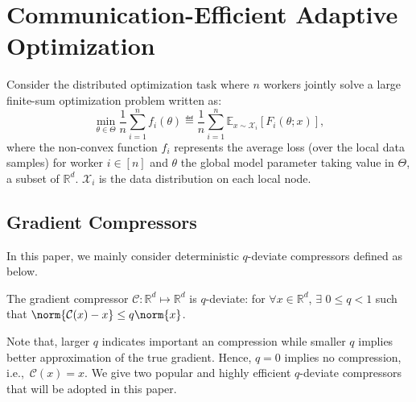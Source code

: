 \documentclass[11pt]{article}
\begin{document}
\section{Communication-Efficient Adaptive Optimization}\label{sec:main}


Consider the distributed optimization task where $n$ workers jointly solve a large finite-sum optimization problem written as:
\begin{equation}\label{eq:opt}
\min \limits_{\theta \in \Theta} \frac{1}{n} \sum_{i=1}^n f_i(\theta)\eqdef \frac{1}{n} \sum_{i=1}^n \mathbb E_{x\sim \mathcal X_i}[F_i(\theta;x)],
\end{equation}
where the non-convex function $f_i$ represents the average loss (over the local data samples) for worker $i \in [n]$ and $\theta$ the global model parameter taking value in $\Theta$, a subset of $\mathbb{R}^d$. $\mathcal X_i$ is the data distribution on each local node.



%
%


\subsection{Gradient Compressors}

In this paper, we mainly consider deterministic $q$-deviate compressors defined as below.

\begin{assumption}\label{ass:quant} The gradient compressor $\mathcal C:\mathbb R^d\mapsto \mathbb R^d$ is $q$-deviate: for $\forall x\in\mathbb R^d$, $\exists$ $0\leq q < 1$ such that $\norm{\mathcal C(x)-x} \leq q \norm{x}$.
\end{assumption}
Note that, larger $q$ indicates important an compression while smaller $q$ implies better approximation of the true gradient. 
Hence, $q=0$ implies no compression, i.e.,~$\mathcal C(x)=x$. 
We give two popular and highly efficient $q$-deviate compressors that will be adopted in this paper.
\end{document}
